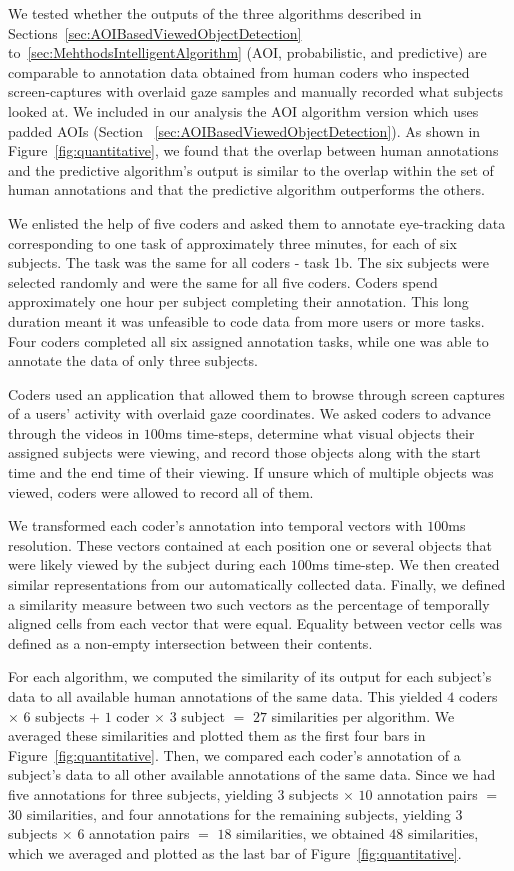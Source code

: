 We tested whether the outputs of the three algorithms described in Sections~\ref{sec:AOIBasedViewedObjectDetection} to~\ref{sec:MehthodsIntelligentAlgorithm} (AOI, probabilistic, and predictive) are comparable to annotation data obtained from human coders who inspected screen-captures with overlaid gaze samples and manually recorded what subjects looked at. We included in our analysis the AOI algorithm version which uses padded AOIs (Section ~\ref{sec:AOIBasedViewedObjectDetection}). As shown in Figure~\ref{fig:quantitative}, we found that the overlap between human annotations and the predictive algorithm's output is similar to the overlap within the set of human annotations and that the predictive algorithm outperforms the others. 

We enlisted the help of five coders and asked them to annotate eye-tracking data corresponding to one task of approximately three minutes, for each of six subjects.  The task was the same for all coders - task 1b. The six subjects were selected randomly and were the same for all five coders. Coders spend approximately one hour per subject completing their annotation. This long duration meant it was unfeasible to code data from more users or more tasks. Four coders completed all six assigned annotation tasks, while one was able to annotate the data of only three subjects. 

Coders used an application that allowed them to browse through screen captures of a users' activity with overlaid gaze coordinates. We asked coders to advance through the videos in $100$ms time-steps, determine what visual objects their assigned subjects were viewing, and record those objects along with the start time and the end time of their viewing. If unsure which of multiple objects was viewed, coders were allowed to record all of them.  

We transformed each coder's annotation into temporal vectors with $100$ms resolution. These vectors contained at each position one or several objects that were likely viewed by the subject during each $100$ms time-step. We then created similar representations from our automatically collected data. Finally, we defined a similarity measure between two such vectors as the percentage of temporally aligned cells from each vector that were equal. Equality between vector cells was defined as a non-empty intersection between their contents.  

For each algorithm, we computed the similarity of its output for each subject's data to all available human annotations of the same data.  This yielded $4$ coders $\times$ $6$ subjects $+$  $1$ coder $\times$ $3$ subject $=$ $27$ similarities per algorithm. We averaged these similarities and plotted them as the first four bars in Figure~\ref{fig:quantitative}. Then, we compared each coder's annotation of a subject's data to all other available annotations of the same data. Since we had five annotations for three subjects, yielding $3$ subjects $\times$ $10$ annotation pairs $=$ $30$ similarities, and four annotations for the remaining subjects, yielding $3$ subjects $\times$ $6$ annotation pairs $=$ $18$ similarities, we obtained $48$ similarities, which we averaged and plotted as the last bar of Figure~\ref{fig:quantitative}.

